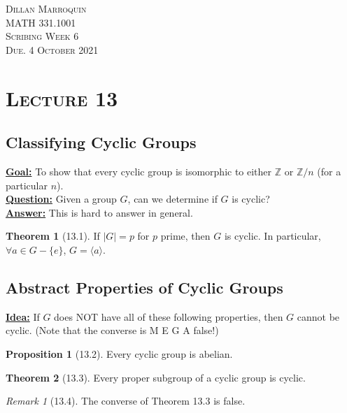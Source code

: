 \documentclass{article}
\newcommand{\Z}{\mathbb{Z}}
\newcommand{\define}[1]{\textbf{\underline{#1}}}
\newcommand{\gen}[1]{\langle#1\rangle}
\theoremstyle{definition}
\newtheorem*{thm}{Theorem}
\newtheorem*{prop}{Proposition}
\theoremstyle{remark}
\newtheorem*{rmk}{Remark}
\begin{document}
    \begin{center}
        \textsc{Dillan Marroquin\\MATH 331.1001\\Scribing Week 6\\Due. 4 October 2021\\}
    \end{center}
        
    \noindent\section*{\textbf{\textsc{Lecture 13}}}{
        \subsection*{Classifying Cyclic Groups}{
            \define{Goal:} To show that every cyclic group is isomorphic to either $\Z$ or $\Z/n$ (for a particular $n$).\\
            
            \noindent\define{Question:} Given a group $G$, can we determine if $G$ is cyclic?\\
            \noindent\define{Answer:} This is hard to answer in general.
            
            \begin{thm}[13.1]
                If $|G|=p$ for $p$ prime, then $G$ is cyclic. In particular, $\forall a \in G-\{e\}$, $G=\gen{a}$.
            \end{thm}
        }
        \subsection*{Abstract Properties of Cyclic Groups}{
            \define{Idea:} If $G$ does NOT have all of these following properties, then $G$ cannot be cyclic. (Note that the converse is M E G A false!)
            
            \begin{prop}[13.2]
                Every cyclic group is abelian.
            \end{prop}
            
            \begin{thm}[13.3]
                Every proper subgroup of a cyclic group is cyclic.
            \end{thm}
            
            \begin{rmk}[13.4]
                The converse of Theorem 13.3 is false.
            \end{rmk}
        }
    }
\end{document}
